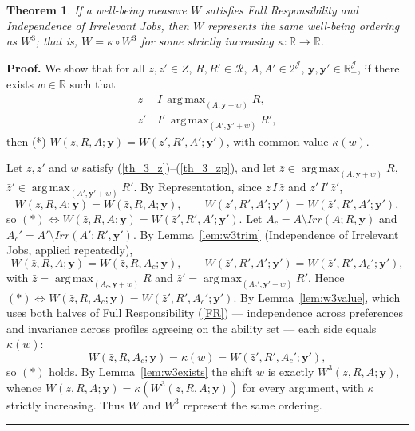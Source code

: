 \documentclass[12pt,thmsb]{article}
\DeclareMathOperator*{\argmax}{arg\,max}
\newtheorem{theorem}{Theorem}
\newenvironment{proof}[1][Proof]{\noindent \textbf{#1.} }{\  \rule{0.5em}{0.5em}}
\begin{document}
\begin{theorem}
\label{thm:w3}
If a well-being measure $W$ satisfies Full Responsibility and Independence of
Irrelevant Jobs, then $W$ represents the same well-being ordering as $W^3$; that
is, $W=\kappa\circ W^3$ for some strictly increasing
$\kappa:\mathbb R\to\mathbb R$.
\end{theorem}

\begin{proof}
We show that for all $z,z'\in Z$, $R,R'\in\mathcal R$, $A,A'\in 2^{\mathcal J}$,
$\mathbf y,\mathbf y'\in\mathbb R_+^{\mathcal J}$, if there exists
$w\in\mathbb R$ such that
\begin{align}
z\,&I\,\argmax_{(A,\mathbf y+w)}R, \label{th_3_z}\\
z'\,&I'\,\argmax_{(A',\mathbf y'+w)}R', \label{th_3_zp}
\end{align}
then (*) $W(z,R,A;\mathbf y)=W(z',R',A';\mathbf y')$, with common value
$\kappa(w)$.

Let $z,z'$ and $w$ satisfy (\ref{th_3_z})--(\ref{th_3_zp}), and let
$\bar z\in\argmax_{(A,\mathbf y+w)}R$, $\bar z'\in\argmax_{(A',\mathbf
y'+w)}R'$. By Representation, since $z\,I\,\bar z$ and $z'\,I'\,\bar z'$,
\begin{equation*}
W(z,R,A;\mathbf y)=W(\bar z,R,A;\mathbf y),\qquad
W(z',R',A';\mathbf y')=W(\bar z',R',A';\mathbf y'),
\end{equation*}
so $(*)\Leftrightarrow W(\bar z,R,A;\mathbf y)=W(\bar z',R',A';\mathbf y')$.
Let $A_c=A\setminus Irr(A;R,\mathbf y)$ and $A_c'=A'\setminus Irr(A';R',\mathbf
y')$. By Lemma~\ref{lem:w3trim} (Independence of Irrelevant Jobs, applied
repeatedly),
\begin{equation*}
W(\bar z,R,A;\mathbf y)=W(\bar z,R,A_c;\mathbf y),\qquad
W(\bar z',R',A';\mathbf y')=W(\bar z',R',A_c';\mathbf y'),
\end{equation*}
with $\bar z=\argmax_{(A_c,\mathbf y+w)}R$ and
$\bar z'=\argmax_{(A_c',\mathbf y'+w)}R'$. Hence
$(*)\Leftrightarrow W(\bar z,R,A_c;\mathbf y)=W(\bar z',R',A_c';\mathbf y')$.
By Lemma~\ref{lem:w3value}, which uses both halves of Full Responsibility
(\ref{FR}) --- independence across preferences and invariance across profiles
agreeing on the ability set --- each side equals $\kappa(w)$:
\begin{equation*}
W(\bar z,R,A_c;\mathbf y)=\kappa(w)=W(\bar z',R',A_c';\mathbf y'),
\end{equation*}
so $(*)$ holds. By Lemma~\ref{lem:w3exists} the shift $w$ is exactly
$W^3(z,R,A;\mathbf y)$, whence $W(z,R,A;\mathbf y)=\kappa(W^3(z,R,A;\mathbf y))$
for every argument, with $\kappa$ strictly increasing. Thus $W$ and $W^3$
represent the same ordering.
\end{proof}
\end{document}
